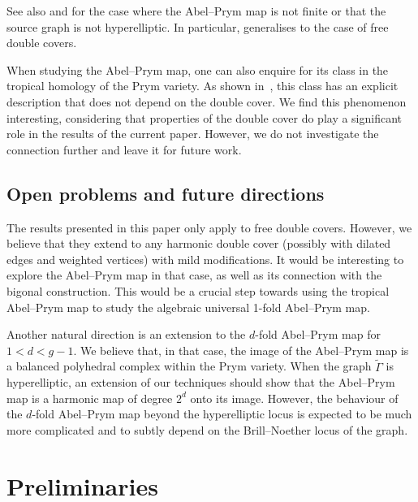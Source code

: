 \documentclass[11pt]{article}
\theoremstyle{definition}
\numberwithin{equation}{section}
\theoremstyle{definition}
\newcommand{\wt}[1]{\widetilde{#1}}
\begin{document}
See also  and  for the case where the Abel--Prym map is not finite or that the source graph is not hyperelliptic. 
\noindent In particular,  generalises 
\cite[Theorem 5.6]{RZ_ngonal} to the case of  free double covers.  

When studying the Abel--Prym map, one can also enquire for its class in the tropical homology of the Prym variety. As shown in~\cite[Theorem 4.25]{RZ_ngonal}, this class has an explicit description that does not depend on the double cover. We find this phenomenon interesting, considering that properties of the double cover do play a significant role in the results of the current paper. However, we do not investigate the connection further and leave it for future work. 

\subsection*{Open problems and future directions}

The results presented in this paper 
only apply to free double covers. However, we believe that they extend to any harmonic double cover (possibly with dilated edges and weighted vertices) with mild modifications. It would 
be  interesting to explore the Abel--Prym map in that case, as well as its connection with the bigonal construction. 
This would be a crucial step towards using the tropical Abel--Prym map to study the algebraic universal 1-fold Abel--Prym map. 

Another natural direction is an extension to the $d$-fold Abel--Prym map for  $1 < d < g-1$. We believe that, in that case, the image of the Abel--Prym map is a balanced polyhedral complex within the Prym variety. When the graph $\wt\Gamma$ is hyperelliptic, an extension of our techniques should show
 that the Abel--Prym map is a harmonic map of degree $2^d$ onto its image. However, the behaviour of the $d$-fold Abel--Prym map beyond the hyperelliptic locus is expected to be much more complicated and to subtly depend  on the Brill--Noether locus of the graph. 

\section{Preliminaries}\label{sec:preliminaries} 
\end{document}
